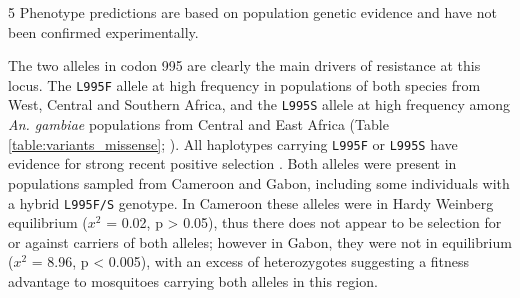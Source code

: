 \documentclass[a4paper,11pt,abstracton,hidelinks]{scrartcl}
\begin{document}
{\begin{landscape}
\begin{table}[h]
\begin{threeparttable}
\begin{tablenotes}
    \item[5] Phenotype predictions are based on population genetic evidence and have not been confirmed experimentally.
    
  \end{tablenotes}
  
  \end{threeparttable}
  
\end{table}
\end{landscape}
} %


%
The two alleles in codon 995 are clearly the main drivers of resistance at this locus.
%
The \texttt{L995F} allele at high frequency in populations of both species from West, Central and Southern Africa, and the \texttt{L995S} allele at high frequency among \textit{An. gambiae} populations from Central and East Africa (Table \ref{table:variants_missense}; \cite{Ag1000gConsortium2017}).
%
All haplotypes carrying \texttt{L995F} or \texttt{L995S} have evidence for strong recent positive selection \cite{Ag1000gConsortium2017}.
%
Both alleles were present in populations sampled from Cameroon and Gabon, including some individuals with a hybrid \texttt{L995F/S} genotype.
%
In Cameroon these alleles were in Hardy Weinberg equilibrium ($x^{2}$ = 0.02, p > 0.05), thus there does not appear to be selection for or against carriers of both alleles; however in Gabon, they were not in equilibrium ($x^{2}$ = 8.96, p < 0.005), with an excess of heterozygotes suggesting a fitness advantage to mosquitoes carrying both alleles in this region.
\end{document}
